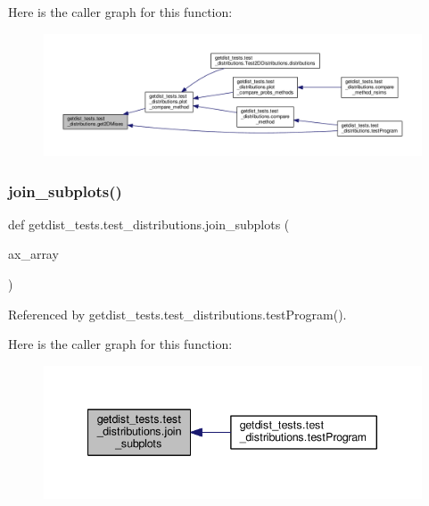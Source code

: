Here is the caller graph for this function\+:
\nopagebreak
\begin{figure}[H]
\begin{center}
\leavevmode
\includegraphics[width=350pt]{namespacegetdist__tests_1_1test__distributions_a33e553d1690409e6be303cd912648ec5_icgraph}
\end{center}
\end{figure}
\mbox{\label{namespacegetdist__tests_1_1test__distributions_a72c14bb92b54c7829aae97e81929524f}} 
\subsubsection{\texorpdfstring{join\+\_\+subplots()}{join\_subplots()}}
{\footnotesize\ttfamily def getdist\+\_\+tests.\+test\+\_\+distributions.\+join\+\_\+subplots (\begin{DoxyParamCaption}\item[{}]{ax\+\_\+array }\end{DoxyParamCaption})}



Referenced by getdist\+\_\+tests.\+test\+\_\+distributions.\+test\+Program().

Here is the caller graph for this function\+:
\nopagebreak
\begin{figure}[H]
\begin{center}
\leavevmode
\includegraphics[width=340pt]{namespacegetdist__tests_1_1test__distributions_a72c14bb92b54c7829aae97e81929524f_icgraph}
\end{center}
\end{figure}
\mbox{\label{namespacegetdist__tests_1_1test__distributions_a3ae94f720e6178acca116decb0f76a8f}} 
